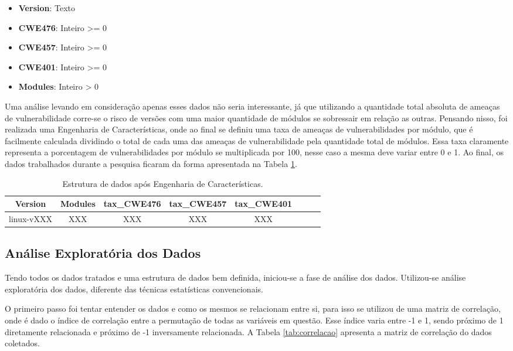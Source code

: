 \begin{itemize}
  \item \textbf{Version}: Texto
  \item \textbf{CWE476}: Inteiro >= 0
  \item \textbf{CWE457}: Inteiro >= 0
  \item \textbf{CWE401}: Inteiro >= 0
  \item \textbf{Modules}: Inteiro > 0
\end{itemize}

Uma análise levando em consideração apenas esses dados não seria interessante,
já que utilizando a quantidade total absoluta de ameaças de vulnerabilidade
corre-se o risco de versões com uma maior quantidade de módulos se sobressair
em relação as outras. Pensando nisso, foi realizada uma Engenharia de
Características, onde ao final se definiu uma taxa de ameaças de
vulnerabilidades por módulo, que é facilmente calculada dividindo o total de
cada uma das ameaças de vulnerabilidade pela quantidade total de módulos. Essa
taxa claramente representa a porcentagem de vulnerabilidades por módulo se
multiplicada por 100, nesse caso a mesma deve variar entre 0 e 1. Ao final, os
dados trabalhados durante a pesquisa ficaram da forma apresentada na
Tabela \ref{tab:data_frame}.

\begin{table}[h]
\centering
\begin{tabular}{cccccccc}
\hline
\rowcolor[HTML]{EFEFEF} 
{Version} & {Modules} & {tax\_CWE476} & {tax\_CWE457} & {tax\_CWE401} \\ \hline
linux-vXXX    & XXX           & XXX              & XXX              & XXX  \\
\hline
\end{tabular}
\caption{Estrutura de dados após Engenharia de Características.}
\label{tab:data_frame}
\end{table}


\subsection{Análise Exploratória dos Dados}\label{metodologia:eda}

Tendo todos os dados tratados e uma estrutura de dados bem definida, iniciou-se
a fase de análise dos dados. Utilizou-se análise exploratória dos dados,
diferente das técnicas estatísticas convencionais.

O primeiro passo foi tentar entender os dados e como os mesmos se relacionam
entre si, para isso se utilizou de uma matriz de correlação, onde é dado o
índice de correlação entre a permutação de todas as variáveis em questão. Esse
índice varia entre -1 e 1, sendo próximo de 1 diretamente relacionada e próximo de
-1 inversamente relacionada. A Tabela \ref{tab:correlacao} apresenta a matriz de
correlação do dados coletados.

